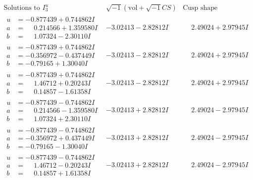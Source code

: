 \documentclass[1p]{elsarticle_modified}
\theoremstyle{definition}
\newcommand{\I}{\sqrt{-1}}
\begin{document}
$$\begin{array}{c|c|c}  
\text{Solutions to }I^u_{3}& \I (\text{vol} + \sqrt{-1}CS) & \text{Cusp shape}\\
 \hline 
\begin{aligned}
u &= -0.877439 + 0.744862 I \\
a &= \phantom{-}0.214566 + 1.359580 I \\
b &= \phantom{-}1.07324 - 2.30110 I\end{aligned}
 & -3.02413 - 2.82812 I & \phantom{-}2.49024 + 2.97945 I \\ \hline\begin{aligned}
u &= -0.877439 + 0.744862 I \\
a &= -0.356972 - 0.437449 I \\
b &= -0.79165 + 1.30040 I\end{aligned}
 & -3.02413 - 2.82812 I & \phantom{-}2.49024 + 2.97945 I \\ \hline\begin{aligned}
u &= -0.877439 + 0.744862 I \\
a &= \phantom{-}1.46712 + 0.20243 I \\
b &= \phantom{-}0.14857 - 1.61358 I\end{aligned}
 & -3.02413 - 2.82812 I & \phantom{-}2.49024 + 2.97945 I \\ \hline\begin{aligned}
u &= -0.877439 - 0.744862 I \\
a &= \phantom{-}0.214566 - 1.359580 I \\
b &= \phantom{-}1.07324 + 2.30110 I\end{aligned}
 & -3.02413 + 2.82812 I & \phantom{-}2.49024 - 2.97945 I \\ \hline\begin{aligned}
u &= -0.877439 - 0.744862 I \\
a &= -0.356972 + 0.437449 I \\
b &= -0.79165 - 1.30040 I\end{aligned}
 & -3.02413 + 2.82812 I & \phantom{-}2.49024 - 2.97945 I \\ \hline\begin{aligned}
u &= -0.877439 - 0.744862 I \\
a &= \phantom{-}1.46712 - 0.20243 I \\
b &= \phantom{-}0.14857 + 1.61358 I\end{aligned}
 & -3.02413 + 2.82812 I & \phantom{-}2.49024 - 2.97945 I \\ \hline\begin{aligned}

\end{aligned}
\end{array}$$
\end{document}
